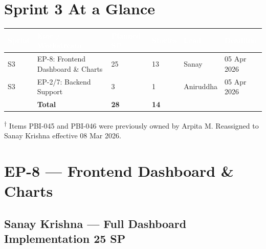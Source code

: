 \documentclass[10pt,a4paper]{article}
\begin{document}
\vspace{0.8em}

\section{Sprint 3 At a Glance}

\renewcommand{\arraystretch}{1.4}
\begin{tabularx}{\textwidth}{|L{1.3cm}|X|L{2.2cm}|L{2.2cm}|L{1.3cm}|L{2cm}|}
\hline
{}
\textcolor{white}{\textbf{Sprint}} &
\textcolor{white}{\textbf{Epic / Workstream}} &
\textcolor{white}{\textbf{Planned SP}} &
\textcolor{white}{\textbf{Stories}} &
\textcolor{white}{\textbf{Lead}} &
\textcolor{white}{\textbf{Deadline}} \\ \hline
S3 & EP-8: Frontend Dashboard \& Charts  & 25 & 13 & Sanay     & 05 Apr 2026 \\ \hline
S3 & EP-2/7: Backend Support             &  3 &  1 & Aniruddha & 05 Apr 2026 \\ \hline
{}
   & \textbf{Total}                       & \textbf{28} & \textbf{14} & & \\ \hline
\end{tabularx}

\vspace{0.5em}
{\small \textsuperscript{$\dagger$} Items PBI-045 and PBI-046 were previously owned by Arpita M. Reassigned to Sanay Krishna effective 08 Mar 2026.}

\newpage

\section{EP-8 — Frontend Dashboard \& Charts}

\subsection*{Sanay Krishna — Full Dashboard Implementation \hfill 25 SP}
\end{document}
